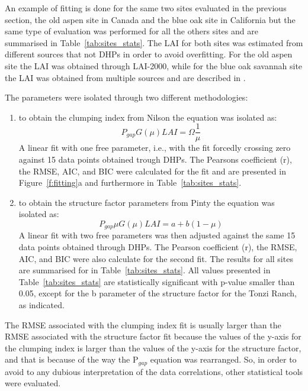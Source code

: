 \documentclass[a4paper,11pt]{report}
\begin{document}
An example of fitting is done for the same two sites evaluated in the previous section, the old aspen site in Canada and the blue oak site in California but the same type of evaluation was performed for all the others sites and are summarised in Table~\ref{tab:sites_stats}. The LAI for both sites was estimated from different sources that not DHPs in order to avoid overfitting. For the old aspen site the LAI was obtained through LAI-2000, while for the blue oak savannah site the LAI was obtained from multiple sources and are described in \citet{Ryu2010}.

The parameters were isolated through two different methodologies:
\begin{enumerate}
 \item to obtain the clumping index from Nilson the equation was isolated as:
\begin{equation}
P_{gap} G(\mu) LAI = \Omega \frac{1}{\mu}
\end{equation}\label{eq:isol_nilson}
A linear fit with one free parameter, i.e., with the fit forcedly crossing zero against 15 data points obtained trough DHPs. The Pearson\textquotesingle s coefficient (r), the RMSE, AIC, and BIC were calculated for the fit and are presented in Figure~\ref{f:fitting}a and furthermore in Table~\ref{tab:sites_stats}. 
 \item to obtain the structure factor parameters from Pinty the equation was isolated as:
\begin{equation}
P_{gap} \mu G(\mu) LAI = a + b (1 - \mu) 
\end{equation}\label{eq:isol_pinty}
A linear fit with two free parameters was then adjusted against the same 15 data points obtained through DHPs. The Pearson coefficient (r), the RMSE, AIC, and BIC were also calculate for the second fit. The results for all sites are summarised for in Table~\ref{tab:sites_stats}. All values presented in Table~\ref{tab:sites_stats} are statistically significant with p-value smaller than 0.05, except for the b parameter of the structure factor for the Tonzi Ranch, as indicated. 
\end{enumerate}

The RMSE associated with the clumping index fit is usually larger than the RMSE associated with the structure factor fit because the values of the y-axis for the clumping index is larger than the values of the y-axis for the structure factor, and that is because of the way the P$_{gap}$ equation was rearranged. So, in order to avoid to any dubious interpretation of the data correlations, other statistical tools were evaluated.
\end{document}
